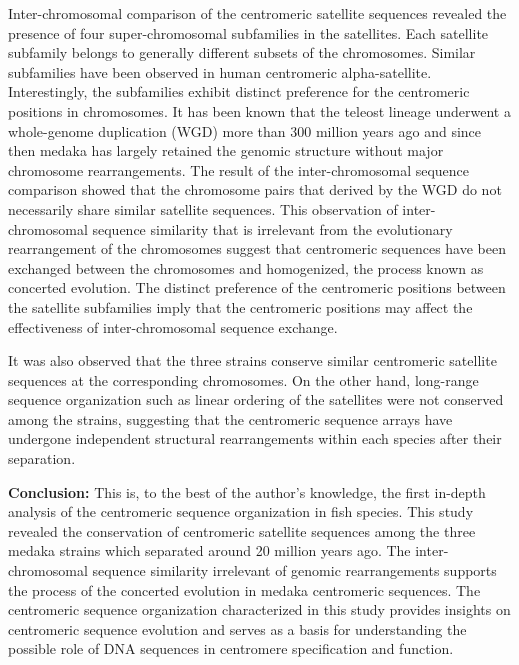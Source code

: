 Inter-chromosomal comparison of the centromeric satellite sequences revealed the presence of four super-chromosomal subfamilies in the satellites. Each satellite subfamily belongs to generally different subsets of the chromosomes. Similar subfamilies have been observed in human centromeric alpha-satellite. Interestingly, the subfamilies exhibit distinct preference for the centromeric positions in chromosomes. It has been known that the teleost lineage underwent a whole-genome duplication (WGD) more than 300 million years ago and since then medaka has largely retained the genomic structure without major chromosome rearrangements. The result of the inter-chromosomal sequence comparison showed that the chromosome pairs that derived by the WGD do not necessarily share similar satellite sequences. This observation of inter-chromosomal sequence similarity that is irrelevant from the evolutionary rearrangement of the chromosomes suggest that centromeric sequences have been exchanged between the chromosomes and homogenized, the process known as concerted evolution. The distinct preference of the centromeric positions between the satellite subfamilies imply that the centromeric positions may affect the effectiveness of inter-chromosomal sequence exchange.

It was also observed that the three strains conserve similar centromeric satellite sequences at the corresponding chromosomes. On the other hand, long-range sequence organization such as linear ordering of the satellites were not conserved among the strains, suggesting that the centromeric sequence arrays have undergone independent structural rearrangements within each species after their separation.

\vspace{0.7cm}
\noindent\textbf{Conclusion:} This is, to the best of the author's knowledge, the first in-depth analysis of the centromeric sequence organization in fish species. This study revealed the conservation of centromeric satellite sequences among the three medaka strains which separated around 20 million years ago. The inter-chromosomal sequence similarity irrelevant of genomic rearrangements supports the process of the concerted evolution in medaka centromeric sequences. The centromeric sequence organization characterized in this study provides insights on centromeric sequence evolution and serves as a basis for understanding the possible role of DNA sequences in centromere specification and function.
